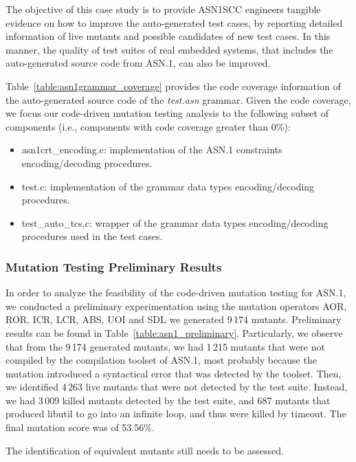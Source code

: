 The objective of this case study is to provide ASN1SCC engineers tangible evidence on how to improve the auto-generated test cases, by reporting detailed information of live mutants and possible candidates of new test cases. In this manner, the quality of test suites of real embedded systems, that includes the auto-generated source code from ASN.1, can also be improved.

Table~\ref{table:asn1grammar_coverage} provides the code coverage information of the auto-generated source code of the \emph{test.asn} grammar. Given the code coverage, we focus our code-driven mutation testing analysis to the following subset of components (i.e., components with code coverage greater than 0\%):

\begin{itemize}
	\item asn1crt\_encoding.c: implementation of the ASN.1 constraints encoding/decoding procedures.
	\item test.c: implementation of the grammar data types encoding/decoding procedures.
	\item test\_auto\_tcs.c: wrapper of the grammar data types encoding/decoding procedures used in the test cases.
\end{itemize}

\subsubsection{Mutation Testing Preliminary Results}



In order to analyze the feasibility of the code-driven mutation testing for ASN.1, we conducted a preliminary experimentation using the mutation operators AOR, ROR, ICR, LCR, ABS, UOI and SDL we generated 9\,174 mutants. Preliminary results can be found in Table~\ref{table:asn1_preliminary}.
Particularly, we observe that from the 9\,174 generated mutants, we had 1\,215 mutants that were not compiled by the compilation toolset of ASN.1, most probably because the mutation introduced a syntactical error that was detected by the toolset.
Then, we identified 4\,263 live mutants that were not detected by the test suite. Instead, we had 3\,009 killed mutants detected by the test suite, and 687 mutants that produced libutil to go into an infinite loop, and thus were killed by timeout. The final mutation score was of 53.56\%.

The identification of equivalent mutants still needs to be assessed.


